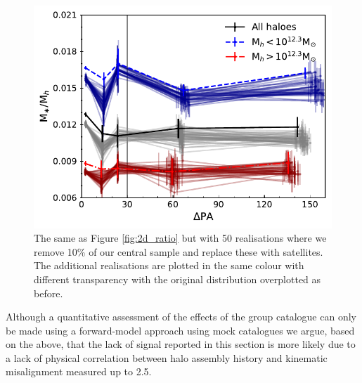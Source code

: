 \begin{figure}
    \centering
	\includegraphics[width=0.7\linewidth]{thesis/latex/halo_assembly_manga/halo_ratio_wsampling.pdf}
    \caption[The same as Figure \ref{fig:2d_ratio} but with 50 realisations where we remove 10\% of our central sample and replace these with satellites]{The same as Figure \ref{fig:2d_ratio} but with 50 realisations where we remove 10\% of our central sample and replace these with satellites. The additional realisations are plotted in the same colour with different transparency with the original distribution overplotted as before.}
    \label{fig:2d_ratio_realisations}
\end{figure}

Although a quantitative assessment of the effects of the group catalogue can only be made using a forward-model approach using mock catalogues we argue, based on the above, that the lack of signal reported in this section is more likely due to a lack of physical correlation between halo assembly history and kinematic misalignment measured up to 2.5\re.

